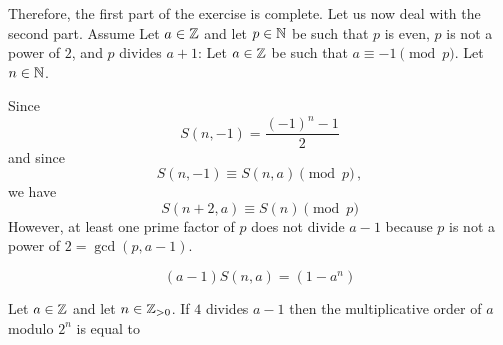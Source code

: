 \begin{solution}
  Therefore, the first part of the exercise is complete.
  Let us now deal with the second part.
  Assume 
  Let $a \in \mathbb{Z}$ and let $p \in \mathbb{N}$ be such that
  $p$ is even, $p$ is not a power of $2$,  and $p$ divides $a + 1$:
  Let $a \in \mathbb{Z}$ be such that  $a \equiv - 1 \pmod{p}$.
  Let $n \in \mathbb{N}$.
  
  Since 
  $$
  S(n, -1) = \frac{{(- 1)}^n - 1}{2}
  $$
  and since 
  $$S(n, - 1) \equiv S(n, a) \pmod{p} \,, $$
  we have
  $$
  S(n + 2, a) \equiv S(n) \pmod{p} 
  $$
  However, at least one prime factor of $p$ does not divide $a - 1$ because  
  $p$ is not a power of $2  = \gcd(p, a - 1)$.
\end{solution}


$$
(a - 1) S(n, a) = (1 - a^n)
$$




\begin{theorem}
  Let $a \in \mathbb{Z}$ and let $n \in \mathbb{Z}_{> 0}$.
  If $4$ divides $a - 1$ then the multiplicative order of $a$ modulo $2^n$ is equal to 
 
\end{theorem}
